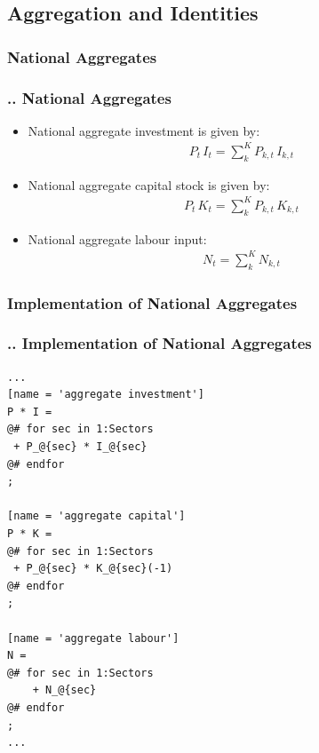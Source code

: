 \documentclass[11pt,aspectratio=169]{beamer}
\begin{document}
\subsection{Aggregation and Identities}

\subsubsection{National Aggregates}
\begin{frame}
\frametitle{{\thesection.\thesubsection.\thesubsubsection} National Aggregates}
\scriptsize
\begin{itemize}
\item National aggregate investment is given by:
\begin{align*}
P_{t} \, I_{t} = \sum_{k}^{K} P_{k,t} \, I_{k,t}
\end{align*}
\item National aggregate capital stock is given by:
\begin{align*}
P_{t} \, K_{t} = \sum_{k}^{K} P_{k,t} \, K_{k,t}
\end{align*}
\item National aggregate labour input:
\begin{align*}
N_{t} = \sum_{k}^{K} N_{k,t}
\end{align*}

\end{itemize}
\end{frame}

\subsubsection{Implementation of National Aggregates}
\begin{frame}[fragile]
\frametitle{{\thesection.\thesubsection.\thesubsubsection} Implementation of National Aggregates}

\begin{lstlisting}[frame = single]
...
[name = 'aggregate investment']
P * I = 
@# for sec in 1:Sectors
 + P_@{sec} * I_@{sec}
@# endfor
;

[name = 'aggregate capital']
P * K = 
@# for sec in 1:Sectors
 + P_@{sec} * K_@{sec}(-1)
@# endfor
;

[name = 'aggregate labour']
N = 
@# for sec in 1:Sectors
    + N_@{sec}
@# endfor
;
...
\end{lstlisting}
\end{frame}
\end{document}
